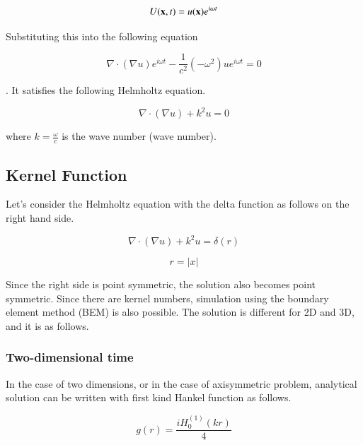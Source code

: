 \begin{equation}
U(\mathbf{x},t) = u(\mathbf{x}) e^{i\omega t}
\end{equation}

Substituting this into the following equation

\begin{equation}
 \nabla\cdot(\nabla u) e^{i\omega t} - \frac{1}{c^2} (-\omega^2) u e^{i\omega t}= 0
\end{equation}

. It satisfies the following Helmholtz equation.
\begin{tcolorbox}[title=Helmholtz Equation]
\begin{equation}
\nabla\cdot(\nabla u) + k^2 u = 0
\end{equation}
\end{tcolorbox}
where $k=\frac{\omega}{c}$ is the wave number (wave number).



\subsection{Kernel Function}
Let's consider the Helmholtz equation with the delta function as follows on the right hand side.

\begin{equation}
\nabla\cdot(\nabla u) + k^2 u = \delta(r)
\end{equation}


\begin{equation}
r=|x|
\end{equation}

Since the right side is point symmetric, the solution also becomes point symmetric. Since there are kernel numbers, simulation using the boundary element method (BEM) is also possible.
The solution is different for 2D and 3D, and it is as follows.

\subsubsection{Two-dimensional time}

In the case of two dimensions, or in the case of axisymmetric problem, analytical solution can be written with first kind Hankel function as follows.

\begin{equation}
g(r)=\frac{iH^{(1)}_0(kr)}{4}
\end{equation}

